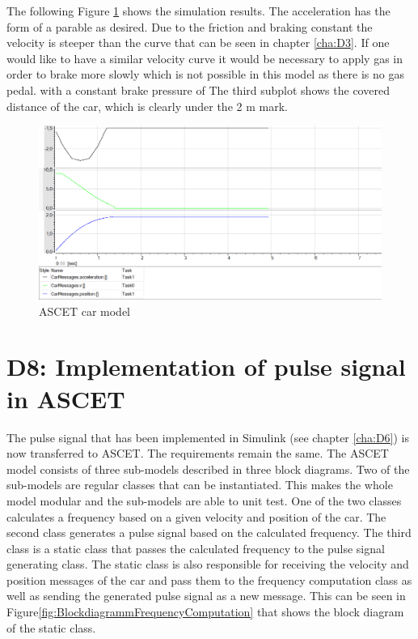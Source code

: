 The following Figure \ref{fig:D7_result} shows the simulation results. The acceleration has the form of a parable as desired. Due to the friction and braking constant the velocity is steeper than the curve that can be seen in chapter \ref{cha:D3}. If one would like to have a similar velocity curve it would be necessary to apply gas in order to brake more slowly which is not possible in this model as there is no gas pedal. with a constant brake pressure of
The third subplot shows the covered
distance of the car, which is clearly under the 2 m mark. 

\begin{figure}[H]
\centering
\includegraphics[width=1\textwidth]{images/ascet_acceleration.png}
\caption{ASCET car model}
\label{fig:D7_result}
\end{figure}

\chapter{D8: Implementation of pulse signal in ASCET}\label{cha:D8}

The pulse signal that has been implemented in Simulink (see chapter \ref{cha:D6}) is now transferred to ASCET. The requirements remain the same.
The ASCET model consists of three sub-models described in three block diagrams. Two of the sub-models are regular classes that can be instantiated. This makes the whole model modular and the sub-models are able to unit test. One of the two classes calculates a frequency based on a given velocity and position of the car. The second class generates a pulse signal based on the calculated frequency.
The third class is a static class that passes the calculated frequency to the pulse signal generating class. The static class is also responsible for receiving the velocity and position messages of the car and pass them to the frequency computation class as well as sending the generated pulse signal as a new message. This can be seen in Figure\ref{fig:BlockdiagrammFrequencyComputation} that shows the block diagram of the static class.

